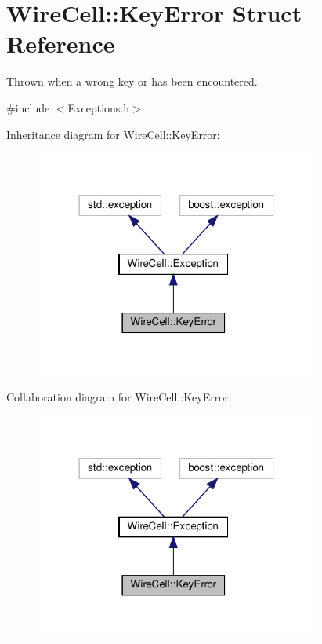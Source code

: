 \hypertarget{struct_wire_cell_1_1_key_error}{}\section{Wire\+Cell\+:\+:Key\+Error Struct Reference}
\label{struct_wire_cell_1_1_key_error}


Thrown when a wrong key or has been encountered.  




{\ttfamily \#include $<$Exceptions.\+h$>$}



Inheritance diagram for Wire\+Cell\+:\+:Key\+Error\+:
\nopagebreak
\begin{figure}[H]
\begin{center}
\leavevmode
\includegraphics[width=266pt]{struct_wire_cell_1_1_key_error__inherit__graph}
\end{center}
\end{figure}


Collaboration diagram for Wire\+Cell\+:\+:Key\+Error\+:
\nopagebreak
\begin{figure}[H]
\begin{center}
\leavevmode
\includegraphics[width=266pt]{struct_wire_cell_1_1_key_error__coll__graph}
\end{center}
\end{figure}
